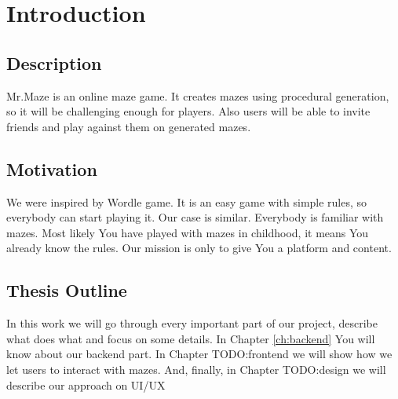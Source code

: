 \chapter{Introduction}\label{ch:intro}
\section{Description}
Mr.Maze is an online maze game. It creates mazes using procedural generation, so it will be challenging enough for players. Also users will be able to invite friends and play against them on generated mazes.
\section{Motivation}
We were inspired by Wordle game. It is an easy game with simple rules, so everybody can start playing it. Our case is similar. Everybody is familiar with mazes. Most likely You have played with mazes in childhood, it means You already know the rules. Our mission is only to give You a platform and content.
\section{Thesis Outline}
In this work we will go through every important part of our project, describe what does what and focus on some details. In Chapter \ref{ch:backend} You will know about our backend part. In Chapter TODO:frontend we will show how we let users to interact with mazes. And, finally, in Chapter TODO:design we will describe our approach on UI/UX